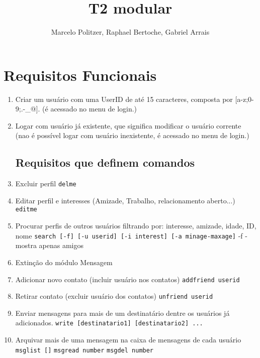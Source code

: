 \documentclass[a4paper,8pt]{article}
\title{T2 modular}
\author{Marcelo Politzer, Raphael Bertoche, Gabriel Arrais}
\begin{document}
\maketitle

\section{Requisitos Funcionais}


\begin{enumerate}
\item Criar um usuário com uma UserID de até 15 caracteres, composta por
		[a-z;0-9;.-\_@]. (é acessado no menu de login.)

\item Logar com usuário já existente, que significa modificar o usuário
		corrente (nao é possível logar com usuário inexistente, é acessado no menu
		de login.)

\subsection{Requisitos que definem comandos}
\item Excluir perfil
		\newline\texttt{delme}

\item Editar perfil e interesses (Amizade, Trabalho, relacionamento aberto...)
		\newline\texttt{editme}

\item Procurar perfis de outros usuários filtrando por: interesse, amizade,
		idade, ID, nome
		\newline\texttt{search [-f] [-u userid] [-i interest] [-a minage-maxage]}
		\newline-f - mostra apenas amigos
\item Extinção do módulo Mensagem

\item Adicionar novo contato (incluir usuário nos contatos)
		\newline\texttt{addfriend userid}

\item Retirar contato (excluir usuário dos contatos)
		\newline\texttt{unfriend userid}

\item Enviar mensagens para mais de um destinatário dentre os usuários já
		adicionados.
		\newline\texttt{write [destinatario1] [destinatario2] ...}

\item Arquivar mais de uma mensagem na caixa de mensagens de cada usuário
		\newline\texttt{msglist []}
		\newline\texttt{msgread number}
		\newline\texttt{msgdel number}

\end{enumerate}
\end{document}
